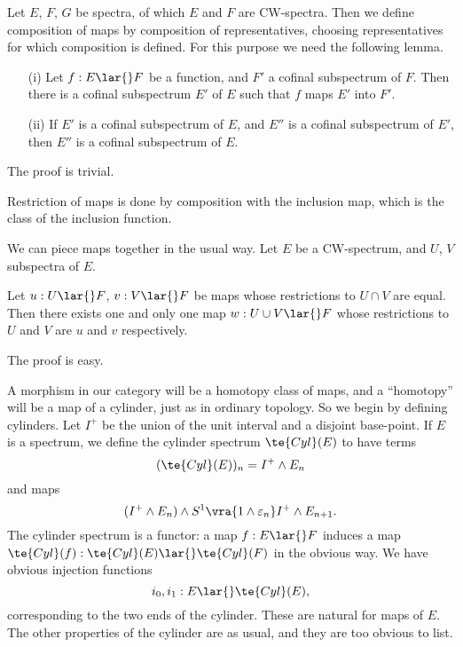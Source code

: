 \documentclass[../main]{subfiles}
\begin{document}
Let $E$, $F$, $G$ be spectra, of which $E$ and $F$ are CW-spectra. Then we define composition of maps by composition of representatives, choosing representatives for which composition is defined. For this purpose we need the following lemma.

\begin{lemma}
    \begin{enumerate}
    \item[(i)]  Let $f:E\lar{} F$ be a function, and $F'$ a cofinal subspectrum of $F$. Then there is a cofinal subspectrum $E'$ of $E$ such that $f$ maps $E'$ into $F'$.
    \item[(ii)] If $E'$ is a cofinal subspectrum of $E$, and $E''$ is a cofinal subspectrum of $E'$, then $E''$ is a cofinal subspectrum of $E$.
    \end{enumerate}
\end{lemma}

The proof is trivial.

Restriction of maps is done by composition with the inclusion map, which is the class of the inclusion function.

We can piece maps together in the usual way. Let $E$ be a CW-spectrum, and $U$, $V$ subspectra of $E$.

\begin{lemma}
Let $u: U\lar{} F$, $v: V\lar{} F$ be maps whose restrictions to $U\cap V$ are equal. Then there exists one and only one map $w: U\cup V \lar{} F$ whose restrictions to $U$ and $V$ are $u$ and $v$ respectively.
\end{lemma}

The proof is easy.

A morphism in our category will be a homotopy class of maps, and a ``homotopy'' will be a map of a cylinder, just as in ordinary topology. So we begin by defining cylinders. Let $I^+$ be the union of the unit interval and a disjoint base-point. If $E$ is a spectrum, we define the cylinder spectrum $\te{Cyl}(E)$ to have terms
\[
(\te{Cyl}(E))_n = I^+ \wedge E_n
\]
and maps
\[
(I^+ \wedge E_n)\wedge S^1
\vra{1\wedge \varepsilon_n}
I^+ \wedge E_{n+1}.
\]
The cylinder spectrum is a functor: a map $f: E\lar{} F$ induces a map $\te{Cyl}(f): \te{Cyl}(E) \lar{} \te{Cyl}(F)$ in the obvious way. We have obvious injection functions
\[
i_0,i_1: E \lar{} \te{Cyl}(E),
\]
corresponding to the two ends of the cylinder. These are natural for maps of $E$. The other properties of the cylinder are as usual, and they are too obvious to list.
\end{document}
